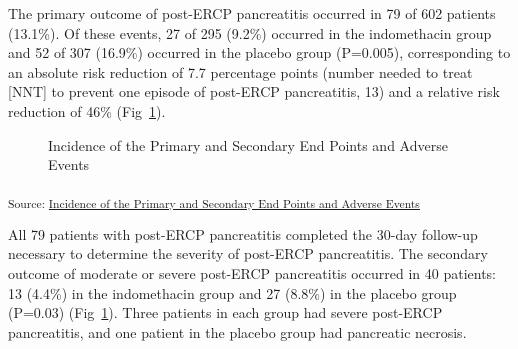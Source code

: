 \documentclass[
  10pt,
  letterpaper,
]{article}
\begin{document}
The primary outcome of post-ERCP pancreatitis occurred in 79 of 602
patients (13.1\%). Of these events, 27 of 295 (9.2\%) occurred in the
indomethacin group and 52 of 307 (16.9\%) occurred in the placebo group
(P=0.005), corresponding to an absolute risk reduction of 7.7 percentage
points (number needed to treat {[}NNT{]} to prevent one episode of
post-ERCP pancreatitis, 13) and a relative risk reduction of 46\%
(Fig~\ref{fig-incidences-adverse-events}).

\begin{figure}[H]


\caption{\label{fig-incidences-adverse-events}Incidence of the Primary
and Secondary End Points and Adverse Events}

\end{figure}%

\textsubscript{Source:
\href{https://mine-cetinkaya-rundel.github.io/indo-rct/notebooks/incidences-preview.html\#cell-fig-incidences-adverse-events}{Incidence
of the Primary and Secondary End Points and Adverse Events}}

All 79 patients with post-ERCP pancreatitis completed the 30-day
follow-up necessary to determine the severity of post-ERCP pancreatitis.
The secondary outcome of moderate or severe post-ERCP pancreatitis
occurred in 40 patients: 13 (4.4\%) in the indomethacin group and 27
(8.8\%) in the placebo group (P=0.03)
(Fig~\ref{fig-incidences-adverse-events}). Three patients in each group
had severe post-ERCP pancreatitis, and one patient in the placebo group
had pancreatic necrosis.
\end{document}
